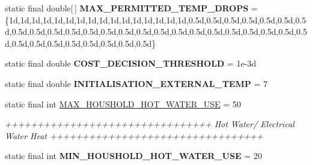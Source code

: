 \begin{DoxyCompactItemize}
\item 
\hypertarget{classuk_1_1ac_1_1dmu_1_1iesd_1_1cascade_1_1base_1_1_consts_ae5cb8168e63d95842b21def5cef410f2}{static final double\mbox{[}$\,$\mbox{]} {\bfseries M\-A\-X\-\_\-\-P\-E\-R\-M\-I\-T\-T\-E\-D\-\_\-\-T\-E\-M\-P\-\_\-\-D\-R\-O\-P\-S} = \{1d,1d,1d,1d,1d,1d,1d,1d,1d,1d,1d,1d,1d,1d,1d,1d,0.\-5d,0.\-5d,0.\-5d,0.\-5d,0.\-5d,0.\-5d,0.\-5d,0.\-5d,0.\-5d,0.\-5d,0.\-5d,0.\-5d,0.\-5d,0.\-5d,0.\-5d,0.\-5d,0.\-5d,0.\-5d,0.\-5d,0.\-5d,0.\-5d,0.\-5d,0.\-5d,0.\-5d,0.\-5d,0.\-5d,0.\-5d,0.\-5d,0.\-5d,0.\-5d,0.\-5d,0.\-5d\}}\label{classuk_1_1ac_1_1dmu_1_1iesd_1_1cascade_1_1base_1_1_consts_ae5cb8168e63d95842b21def5cef410f2}

\item 
\hypertarget{classuk_1_1ac_1_1dmu_1_1iesd_1_1cascade_1_1base_1_1_consts_adf546f9a7efcdb8238e32156b6601a5c}{static final double {\bfseries C\-O\-S\-T\-\_\-\-D\-E\-C\-I\-S\-I\-O\-N\-\_\-\-T\-H\-R\-E\-S\-H\-O\-L\-D} = 1e-\/3d}\label{classuk_1_1ac_1_1dmu_1_1iesd_1_1cascade_1_1base_1_1_consts_adf546f9a7efcdb8238e32156b6601a5c}

\item 
\hypertarget{classuk_1_1ac_1_1dmu_1_1iesd_1_1cascade_1_1base_1_1_consts_a0096e45fe68f2ce80a6a937602062e21}{static final double {\bfseries I\-N\-I\-T\-I\-A\-L\-I\-S\-A\-T\-I\-O\-N\-\_\-\-E\-X\-T\-E\-R\-N\-A\-L\-\_\-\-T\-E\-M\-P} = 7}\label{classuk_1_1ac_1_1dmu_1_1iesd_1_1cascade_1_1base_1_1_consts_a0096e45fe68f2ce80a6a937602062e21}

\item 
\hypertarget{classuk_1_1ac_1_1dmu_1_1iesd_1_1cascade_1_1base_1_1_consts_adb645f1e6a2df432ec462fee492552fa}{static final int \hyperlink{classuk_1_1ac_1_1dmu_1_1iesd_1_1cascade_1_1base_1_1_consts_adb645f1e6a2df432ec462fee492552fa}{M\-A\-X\-\_\-\-H\-O\-U\-S\-H\-O\-L\-D\-\_\-\-H\-O\-T\-\_\-\-W\-A\-T\-E\-R\-\_\-\-U\-S\-E} = 50}\label{classuk_1_1ac_1_1dmu_1_1iesd_1_1cascade_1_1base_1_1_consts_adb645f1e6a2df432ec462fee492552fa}

\begin{DoxyCompactList}\small\item\em ++++++++++++++++++++++++++++++++ Hot Water/ Electrical Water Heat +++++++++++++++++++++++++++++++++ \end{DoxyCompactList}\item 
\hypertarget{classuk_1_1ac_1_1dmu_1_1iesd_1_1cascade_1_1base_1_1_consts_a8b5ccf856c2f3150d2b7ab6d4a2a226b}{static final int {\bfseries M\-I\-N\-\_\-\-H\-O\-U\-S\-H\-O\-L\-D\-\_\-\-H\-O\-T\-\_\-\-W\-A\-T\-E\-R\-\_\-\-U\-S\-E} = 20}\label{classuk_1_1ac_1_1dmu_1_1iesd_1_1cascade_1_1base_1_1_consts_a8b5ccf856c2f3150d2b7ab6d4a2a226b}


\end{DoxyCompactItemize}
